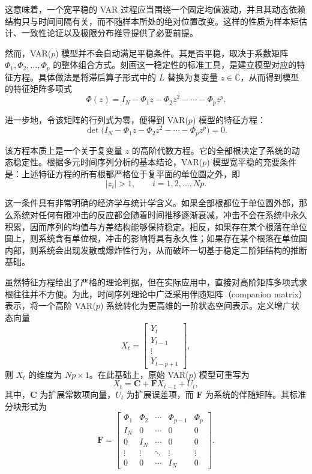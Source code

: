 \documentclass[UTF8,a4paper,12pt]{ctexbook}
\begin{document}
这意味着，一个宽平稳的 VAR 过程应当围绕一个固定均值波动，并且其动态依赖结构只与时间间隔有关，而不随样本所处的绝对位置改变。这样的性质为样本矩估计、一致性论证以及极限分布推导提供了必要前提。

然而，VAR($p$) 模型并不会自动满足平稳条件。其是否平稳，取决于系数矩阵 $\Phi_1,\Phi_2,\dots,\Phi_p$ 的整体组合方式。刻画这一稳定性的标准工具，是建立模型对应的特征方程。具体做法是将滞后算子形式中的 $L$ 替换为复变量 $z\in\mathbb{C}$，从而得到模型的特征矩阵多项式
\begin{equation}
\Phi(z)=I_N-\Phi_1 z-\Phi_2 z^2-\cdots-\Phi_p z^p.
\end{equation}

进一步地，令该矩阵的行列式为零，便得到 VAR($p$) 模型的特征方程：
\begin{equation}
\det\bigl(I_N-\Phi_1 z-\Phi_2 z^2-\cdots-\Phi_p z^p\bigr)=0.
\end{equation}

该方程本质上是一个关于复变量 $z$ 的高阶代数方程。它的全部根决定了系统的动态稳定性。根据多元时间序列分析的基本结论，VAR($p$) 模型宽平稳的充要条件是：上述特征方程的所有根都严格位于复平面的单位圆之外，即
\begin{equation}
|z_i|>1, \qquad i=1,2,\dots,Np.
\end{equation}

这一条件具有非常明确的经济学与统计学含义。如果全部根都位于单位圆外部，那么系统对任何有限冲击的反应都会随着时间推移逐渐衰减，冲击不会在系统中永久积累，因而序列的均值与方差结构能够保持稳定。相反，如果存在某个根落在单位圆上，则系统含有单位根，冲击的影响将具有永久性；如果存在某个根落在单位圆内部，则系统会出现发散或爆炸性行为，从而破坏一切基于稳定二阶矩结构的推断基础。

虽然特征方程给出了严格的理论判据，但在实际应用中，直接对高阶矩阵多项式求根往往并不方便。为此，时间序列理论中广泛采用伴随矩阵（companion matrix）表示，将一个高阶 VAR($p$) 系统转化为更高维的一阶状态空间表示。定义增广状态向量
\begin{equation}
X_t=
\begin{bmatrix}
Y_t\\
Y_{t-1}\\
\vdots\\
Y_{t-p+1}
\end{bmatrix},
\end{equation}
则 $X_t$ 的维度为 $Np\times 1$。在此基础上，原始 VAR($p$) 模型可重写为
\begin{equation}
X_t = \mathbf{C} + \mathbf{F}X_{t-1} + U_t,
\end{equation}
其中，$\mathbf{C}$ 为扩展常数项向量，$U_t$ 为扩展误差项，而 $\mathbf{F}$ 为系统的伴随矩阵。其标准分块形式为
\begin{equation}
\mathbf{F}=
\begin{bmatrix}
\Phi_1 & \Phi_2 & \cdots & \Phi_{p-1} & \Phi_p\\
I_N & 0 & \cdots & 0 & 0\\
0 & I_N & \cdots & 0 & 0\\
\vdots & \vdots & \ddots & \vdots & \vdots\\
0 & 0 & \cdots & I_N & 0
\end{bmatrix}.
\end{equation}
\end{document}
